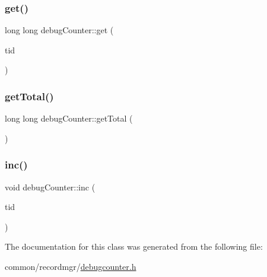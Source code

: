 \mbox{\label{classdebugCounter_a4308308b267bcd03046ddb0db0d64a60}} 
\subsubsection{\texorpdfstring{get()}{get()}}
{\footnotesize\ttfamily long long debug\+Counter\+::get (\begin{DoxyParamCaption}\item[{const int}]{tid }\end{DoxyParamCaption})\hspace{0.3cm}{\ttfamily [inline]}}

\mbox{\label{classdebugCounter_a2086ed1038e4c467affe711a7dbf6ac1}} 
\subsubsection{\texorpdfstring{get\+Total()}{getTotal()}}
{\footnotesize\ttfamily long long debug\+Counter\+::get\+Total (\begin{DoxyParamCaption}{ }\end{DoxyParamCaption})\hspace{0.3cm}{\ttfamily [inline]}}

\mbox{\label{classdebugCounter_a1689449989f1da7622d97dec001bffae}} 
\subsubsection{\texorpdfstring{inc()}{inc()}}
{\footnotesize\ttfamily void debug\+Counter\+::inc (\begin{DoxyParamCaption}\item[{const int}]{tid }\end{DoxyParamCaption})\hspace{0.3cm}{\ttfamily [inline]}}



The documentation for this class was generated from the following file\+:\begin{DoxyCompactItemize}
\item 
common/recordmgr/\hyperlink{debugcounter_8h}{debugcounter.\+h}\end{DoxyCompactItemize}

